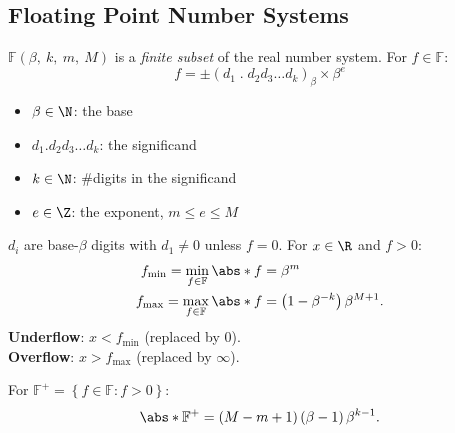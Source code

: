 \documentclass{article}
\begin{document}
\begin{multicols}{3}
    \subsection{Floating Point Number Systems}
    \(\mathbb{F}\left( \beta,\: k,\: m,\: M \right)\)
    is a \textit{finite subset} of the real number system. For \(f \in \mathbb{F}\):
    \begin{equation*}
        f = \pm \left( d_1\;\mathbf{.}\;d_2 d_3 \dots d_k \right)_\beta \times \beta^e
    \end{equation*}
    \begin{itemize}
        \item \(\beta \in \N\): the base
        \item \(d_1.d_2 d_3 \dots d_k\): the significand
        \item \(k \in \N\): \#digits in the significand
        \item \(e \in \Z\): the exponent, \(m \leq e \leq M\)
    \end{itemize}
    \(d_i\) are base-\(\beta\) digits with \(d_1 \neq 0\) unless \(f = 0\).
    For \(x \in \R\) and \(f > 0\):
    \begin{align*}
        f_{\min} = \min_{f \in \mathbb{F}} \abs*{f} & = \beta^m                                      \\
        f_{\max} = \max_{f \in \mathbb{F}} \abs*{f} & = \left( 1 - \beta^{-k} \right) \beta^{M + 1}.
    \end{align*}
    \textbf{Underflow}: \(x < f_{\min}\) (replaced by \(0\)). \\
    \textbf{Overflow}: \(x > f_{\max}\) (replaced by \(\infty\)).

    For \(\mathbb{F}^+ = \left\{ f \in \mathbb{F} : f > 0 \right\}\):
    \begin{equation*}
        \abs*{\mathbb{F}^+} = \left( M - m + 1 \right) \left( \beta - 1 \right) \beta^{k - 1}.
    \end{equation*}

\end{multicols}
\end{document}
